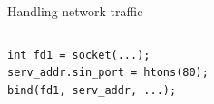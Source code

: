 \documentclass{beamer}
\begin{document}
\begin{frame}[fragile]{Handling network traffic}
\begin{columns}
\begin{column}[t]{0.5\textwidth}
\begin{verbatim}
int fd1 = socket(...);
serv_addr.sin_port = htons(80);
bind(fd1, serv_addr, ...);
\end{verbatim}
\end{column}
\begin{column}[t]{0.5\textwidth}  %
    \begin{center}
\end{center}
\end{column}
\end{columns}
\end{frame}
\end{document}
